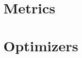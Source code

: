 
\clearpage

\section{Metrics}
\label{sec:Metrics}
\ifitkFullVersion

\fi


\section{Optimizers}
\label{sec:Optimizers}
\ifitkFullVersion

\fi













